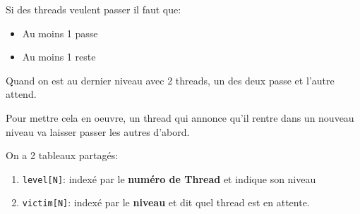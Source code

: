 Si des threads veulent passer il faut que:

\begin{itemize}
\tightlist
\item
  Au moins 1 passe
\item
  Au moins 1 reste
\end{itemize}

Quand on est au dernier niveau avec 2 threads, un des deux passe et
l'autre attend.

Pour mettre cela en oeuvre, un thread qui annonce qu'il rentre dans un
nouveau niveau va laisser passer les autres d'abord.

On a 2 tableaux partagés:

\begin{enumerate}
\def\labelenumi{\arabic{enumi}.}
\tightlist
\item
  \texttt{level{[}N{]}}: indexé par le \textbf{numéro de Thread} et
  indique son niveau
\item
  \texttt{victim{[}N{]}}: indexé par le \textbf{niveau} et dit quel
  thread est en attente.
\end{enumerate}

